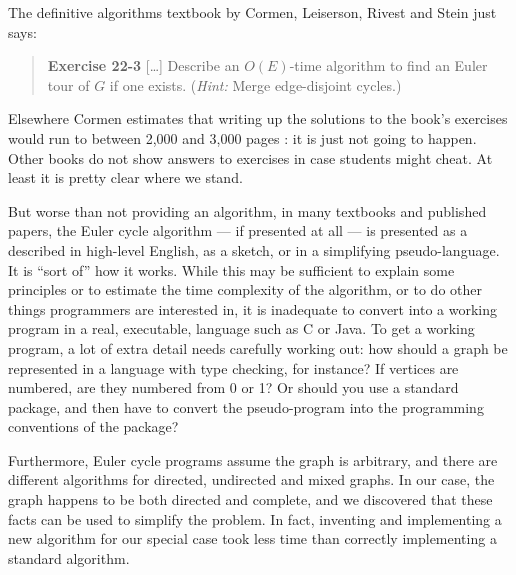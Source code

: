 \documentclass[prodmode,acmtecs]{acmsmall} %
\begin{document}
The definitive algorithms textbook by Cormen, Leiserson, Rivest and Stein just says: %

\begin{quote}\sf
\textbf{Exercise 22-3} [\ldots]
Describe an $O(E)$-time algorithm to find an Euler tour of $G$ if one exists. (\emph{Hint:\/} Merge edge-disjoint cycles.)\hfill\cite{cormen} 
\end{quote}

Elsewhere Cormen estimates that writing up the solutions to the book's exercises would run to between 2,000 and 3,000 pages \cite{cormen-web}: it is just not going to happen. Other books do not show answers to exercises in case students might cheat. At least it is pretty clear where we stand. 

But worse than not providing an algorithm, in many textbooks and published papers, the Euler cycle algorithm --- if presented at all ---  is presented as a described in high-level English, as a sketch, or in a simplifying pseudo-language. It is ``sort of'' how it works. While this may be sufficient to explain some principles or to estimate the time complexity of the algorithm, or to do other things programmers are interested in, it is inadequate to convert into a working program in a real, executable, language such as C or Java. To get a working program, a lot of extra detail needs carefully working out: how should a graph be represented in a language with type checking, for instance? If vertices are numbered, are they numbered from 0 or 1? Or should you use a standard package, and then have to convert the pseudo-program into the programming conventions of the package?

Furthermore, Euler cycle programs assume the graph is arbitrary, and there are different algorithms for directed, undirected and mixed graphs. In our case, the graph happens to be both directed and complete, and we discovered that these facts can be used to simplify the problem. In fact, inventing and implementing a new algorithm for our special case took less time than correctly implementing a standard algorithm. 
\end{document}
